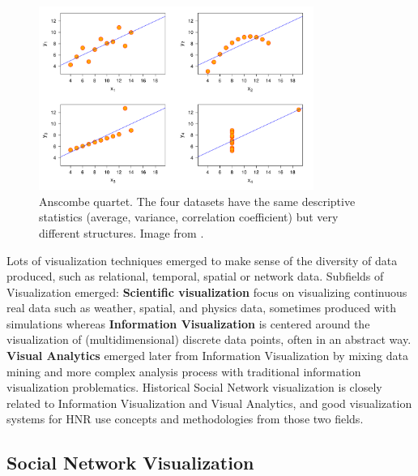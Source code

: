 \begin{figure}
    \centering %
    \includegraphics[width=0.8\textwidth]{static/figures/RelatedWork/Anscombe.pdf}
    \caption{Anscombe quartet. The four datasets have the same descriptive statistics (average, variance, correlation coefficient) but very different structures. Image from \cite{anscombeGraphsStatisticalAnalysis1973}.}
    \label{fig:anscombe-quartet}
\end{figure}


Lots of visualization techniques emerged to make sense of the diversity of data produced, such as relational, temporal, spatial or network data.
Subfields of Visualization emerged: \textbf{Scientific visualization} focus on visualizing continuous real data such as weather, spatial, and physics data, sometimes produced with simulations whereas \textbf{Information Visualization} is centered around the visualization of (multidimensional) discrete data points, often in an abstract way. \textbf{Visual Analytics} emerged later from Information Visualization by mixing data mining and more complex analysis process with traditional information visualization problematics.
Historical Social Network visualization is closely related to Information Visualization and Visual Analytics, and good visualization systems for HNR use concepts and methodologies from those two fields.


\subsection{Social Network Visualization}


